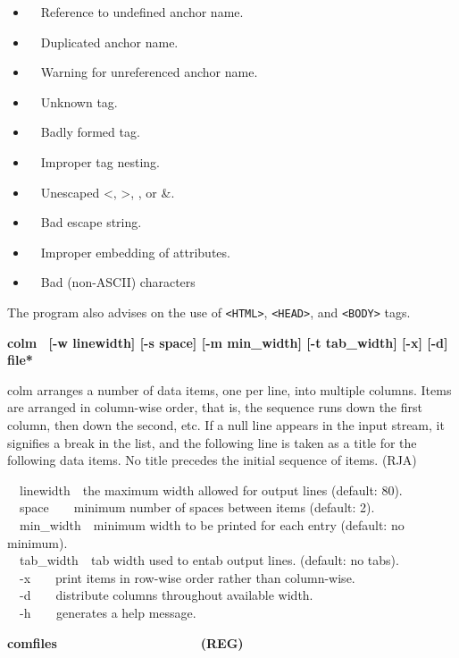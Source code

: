 \begin{itemize}
\item \ \ Reference to undefined anchor name.
\item \ \ Duplicated anchor name.
\item \ \ Warning for unreferenced anchor name.
\item \ \ Unknown tag.
\item \ \ Badly formed tag.
\item \ \ Improper tag nesting.
\item \ \ Unescaped {\textless}, {\textgreater}, {\textquotedbl}, or \&.
\item \ \ Bad escape string.
\item \ \ Improper embedding of attributes.
\item \ \ Bad (non-ASCII) characters
\end{itemize}
The program also advises on the use of
\texttt{{\textless}HTML{\textgreater}},
\texttt{{\textless}HEAD{\textgreater}}, and
\texttt{{\textless}BODY{\textgreater}} tags. 

{\sffamily\bfseries
colm \ \textrm{\textmd{[-w linewidth] [-s space] [-m min\_width] [-t
tab\_width] [-x] [-d] file*}}}

\textsf{colm} arranges a number of data items, one per line, into
multiple columns. Items are arranged in column-wise order, that is, the
sequence runs down the first column, then down the second, etc. If a
null line appears in the input stream, it signifies a break in the
list, and the following line is taken as a title for the following data
items. No title precedes the initial sequence of items. (RJA)

\textsf{\ \ linewidth\ \ }the maximum width allowed for output lines
(default: 80).\\
\ \ \textsf{space\ \ \ \ }minimum number of spaces between items
(default: 2).\\
\ \ \textsf{min\_width\ \ }minimum width to be printed for each entry
(default: no minimum).\\
\ \ \textsf{tab\_width}\texttt{\ \ }tab width used to entab output
lines. (default: no tabs).\\
\ \ \textsf{{}-x}\ \ \ \ print items in row-wise order rather than
column-wise.\\
\ \ \textsf{{}-d}\ \ \ \ distribute columns throughout available
width.\\
\ \ \textsf{{}-h}\texttt{\ \ \ \ }generates a help message.

{\sffamily\bfseries
comfiles\ \ \ \ \ \ \ \ \ \ \ \ \ \ \ \ \ \ \ \ (REG)}

